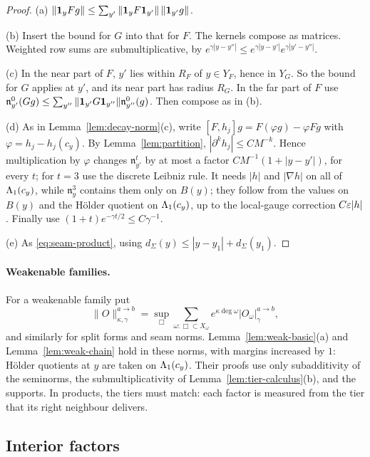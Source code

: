 \begin{proof}
(a) $\|\mathbf 1_yFg\|\le\sum_{y'}\|\mathbf 1_yF\mathbf 1_{y'}\|\,\|\mathbf 1_{y'}g\|$.

(b) Insert the bound for $G$ into that for $F$. The kernels compose as matrices. Weighted row sums are submultiplicative, by $e^{\gamma|y-y''|}\le e^{\gamma|y-y'|}e^{\gamma|y'-y''|}$.

(c) In the near part of $F$, $y'$ lies within $R_F$ of $y\in Y_F$, hence in $Y_G$. So the bound for $G$ applies at $y'$, and its near part has radius $R_G$. In the far part of $F$ use $\mathfrak n^0_{y'}(Gg)\le\sum_{y''}\|\mathbf 1_{y'}G\mathbf 1_{y''}\|\mathfrak n^0_{y''}(g)$. Then compose as in (b).

(d) As in Lemma~\ref{lem:decay-norm}(c), write $[F,h_j]g=F(\varphi g)-\varphi Fg$ with $\varphi=h_j-h_j(c_y)$. By Lemma~\ref{lem:partition}, $|\partial^k h_j|\le CM^{-k}$. Hence multiplication by $\varphi$ changes $\mathfrak n^t_{y'}$ by at most a factor $CM^{-1}(1+|y-y'|)$, for every $t$; for $t=3$ use the discrete Leibniz rule. It needs $|h|$ and $|\nabla h|$ on all of $\Lambda_1(c_y)$, while $\mathfrak n^3_y$ contains them only on $B(y)$; they follow from the values on $B(y)$ and the H\"older quotient on $\Lambda_1(c_y)$, up to the local-gauge correction $C\varepsilon|h|$. Finally use $(1+t)e^{-\gamma t/2}\le C\gamma^{-1}$.

(e) As \eqref{eq:seam-product}, using $d_\Sigma(y)\le|y-y_1|+d_\Sigma(y_1)$.
\end{proof}

\paragraph{Weakenable families.} For a weakenable family put
\[
\|O\|^{a\to b}_{\kappa,\gamma}=\sup_\Box\sum_{\omega:\Box\subset X_\omega}e^{\kappa\deg\omega}|O_\omega|^{a\to b}_\gamma ,
\]
and similarly for split forms and seam norms. Lemma~\ref{lem:weak-basic}(a) and Lemma~\ref{lem:weak-chain} hold in these norms, with margins increased by $1$: H\"older quotients at $y$ are taken on $\Lambda_1(c_y)$. Their proofs use only subadditivity of the seminorms, the submultiplicativity of Lemma~\ref{lem:tier-calculus}(b), and the supports. In products, the tiers must match: each factor is measured from the tier that its right neighbour delivers.

\subsection{Interior factors}

